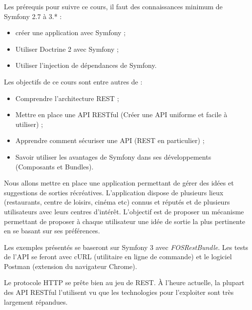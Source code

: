 \documentclass[big]{zmdocument}
\begin{document}
Les prérequis pour suivre ce cours, il faut des connaissances minimum de Symfony 2.7 à 3.* :



\begin{itemize}
\item créer une application avec Symfony ;
\item Utiliser Doctrine 2 avec Symfony ;
\item Utiliser l'injection de dépendances de Symfony.
\end{itemize}


Les objectifs de ce cours sont entre autres de :



\begin{itemize}
\item Comprendre l'architecture REST ;
\item Mettre en place une API RESTful (Créer une API uniforme et facile à utiliser) ;
\item Apprendre comment sécuriser une API (REST en particulier) ;
\item Savoir utiliser les avantages de Symfony dans ses développements (Composants et Bundles).
\end{itemize}




Nous allons mettre en place une application permettant de gérer des idées et suggestions de sorties récréatives. 
L'application dispose de plusieurs lieux (restaurants, centre de loisirs, cinéma etc) connus et réputés et de plusieurs utilisateurs avec leurs centres d'intérêt.
L'objectif est de proposer un mécanisme permettant de proposer à chaque utilisateur une idée de sortie la plus pertinente en se basant sur ses préférences.





Les exemples présentés se baseront sur Symfony 3 avec \textit{FOSRestBundle}. Les tests de l'API se feront avec cURL (utilitaire en ligne de commande) et le logiciel Postman (extension du navigateur Chrome).



\horizontalLine



Le protocole HTTP se prête bien au jeu de REST. À l'heure actuelle, la plupart des API RESTful l'utilisent vu que les technologies pour l'exploiter sont très largement répandues.
\end{document}
